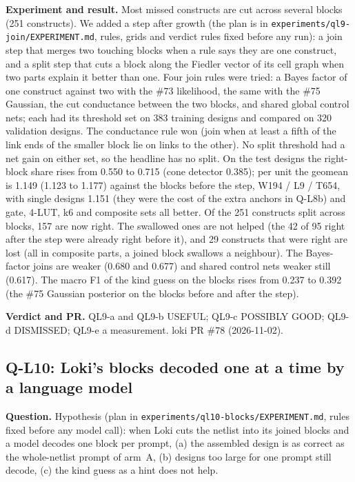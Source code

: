 \documentclass[conference]{IEEEtran}
\newcommand{\hev}[1]{\par\smallskip\noindent\textbf{#1}}
\newcommand{\code}[1]{\texttt{#1}}
\begin{document}
\hev{Experiment and result.} Most missed constructs are cut across several blocks (251 constructs). We added a step after growth (the plan is in
\code{experiments/ql9-join/EXPERIMENT.md}, rules, grids and verdict rules fixed before any run): a join step that merges two touching blocks when a rule says they are one construct, and a split step that cuts a
block along the Fiedler vector of its cell graph when two parts explain it better than one. Four join rules were tried: a Bayes factor of one construct against two with the \#73 likelihood, the same with the
\#75 Gaussian, the cut conductance between the two blocks, and shared global control nets; each had its threshold set on 383 training designs and compared on 320 validation designs. The conductance rule won
(join when at least a fifth of the link ends of the smaller block lie on links to the other). No split threshold had a net gain on either set, so the headline has no split. On the test designs the right-block share rises from 0.550 to 0.715
(cone detector 0.385); per unit the geomean is 1.149 (1.123 to 1.177) against the blocks before the step, W194 / L9 / T654, with single designs 1.151 (they were the cost of the extra anchors in Q-L8b) and gate, 4-LUT, k6 and
composite sets all better. Of the 251 constructs split across blocks, 157 are now right. The swallowed ones are not helped (the 42 of 95 right after the step were already right before it), and 29 constructs that were
right are lost (all in composite parts, a joined block swallows a neighbour). The Bayes-factor joins are weaker (0.680 and 0.677) and shared control nets weaker still (0.617). The macro F1 of the kind guess on the
blocks rises from 0.237 to 0.392 (the \#75 Gaussian posterior on the blocks before and after the step).

\hev{Verdict and PR.} QL9-a and QL9-b USEFUL; QL9-c POSSIBLY GOOD; QL9-d DISMISSED; QL9-e a measurement. loki PR \#78 (2026-11-02).

\subsection{Q-L10: Loki's blocks decoded one at a time by a language model}
\label{rec:ql10}

\hev{Question.} Hypothesis (plan in \code{experiments/ql10-blocks/EXPERIMENT.md}, rules fixed before any model call): when Loki cuts the netlist into its joined blocks and a model decodes one block per prompt, (a) the assembled design is as correct as the whole-netlist prompt of arm~A, (b) designs too large for one prompt still decode, (c) the kind guess as a hint does not help.
\end{document}
